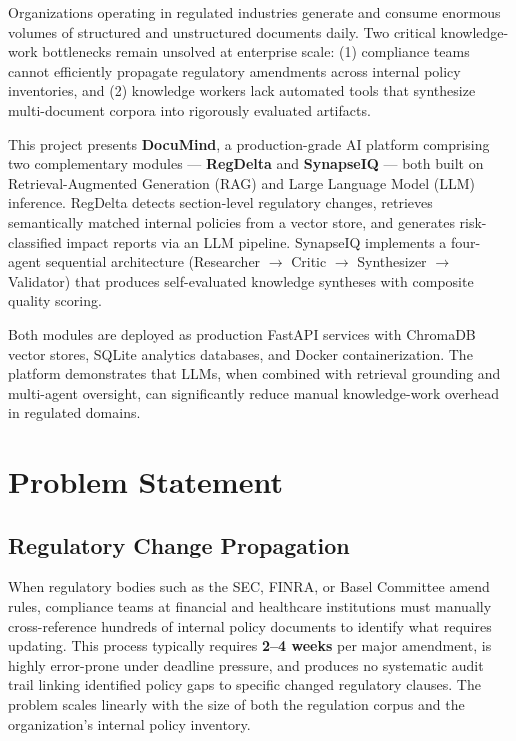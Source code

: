 \documentclass[12pt,letterpaper]{article}
\begin{document}
Organizations operating in regulated industries generate and consume enormous volumes of
structured and unstructured documents daily. Two critical knowledge-work bottlenecks remain
unsolved at enterprise scale: (1) compliance teams cannot efficiently propagate regulatory
amendments across internal policy inventories, and (2) knowledge workers lack automated
tools that synthesize multi-document corpora into rigorously evaluated artifacts.

This project presents \textbf{DocuMind}, a production-grade AI platform comprising two
complementary modules --- \textbf{RegDelta} and \textbf{SynapseIQ} --- both built on
Retrieval-Augmented Generation (RAG) and Large Language Model (LLM) inference.
RegDelta detects section-level regulatory changes, retrieves semantically matched internal
policies from a vector store, and generates risk-classified impact reports via an LLM
pipeline. SynapseIQ implements a four-agent sequential architecture
(Researcher $\to$ Critic $\to$ Synthesizer $\to$ Validator) that produces self-evaluated
knowledge syntheses with composite quality scoring.

Both modules are deployed as production FastAPI services with ChromaDB vector stores,
SQLite analytics databases, and Docker containerization. The platform demonstrates that
LLMs, when combined with retrieval grounding and multi-agent oversight, can significantly
reduce manual knowledge-work overhead in regulated domains.

\section{Problem Statement}

\subsection{Regulatory Change Propagation}

When regulatory bodies such as the SEC, FINRA, or Basel Committee amend rules, compliance
teams at financial and healthcare institutions must manually cross-reference hundreds of
internal policy documents to identify what requires updating. This process typically
requires \textbf{2--4 weeks} per major amendment, is highly error-prone under deadline
pressure, and produces no systematic audit trail linking identified policy gaps to specific
changed regulatory clauses. The problem scales linearly with the size of both the
regulation corpus and the organization's internal policy inventory.
\end{document}
